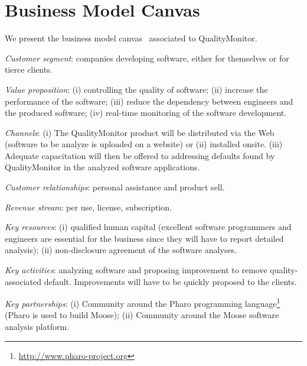 \documentclass[runningheads]{llncs}
\begin{document}

\section{Business Model Canvas}

\newcommand{\vspc}{\vspace{0.1cm}}
We present the business model canvas~\cite{Oste10a} associated to QualityMonitor. \vspc

\noindent\emph{Customer segment}: companies developing software, either for themselves or for tierce clients.\vspc

\noindent\emph{Value proposition}: (i) controlling the quality of software; (ii) increase the performance of the software; (iii) reduce the dependency between engineers and the produced software; (iv) real-time monitoring of the software development. \vspc

\noindent\emph{Channels}: (i) The QualityMonitor product will be distributed via the Web (software to be analyze is uploaded on a website) or (ii) installed onsite. (iii) Adequate capacitation will then be offered to addressing defaults found by QualityMonitor in the analyzed software applications. \vspc

\noindent\emph{Customer relationships}: personal assistance and product sell.\vspace{0.05cm}

\noindent\emph{Revenue stream}: per use, license, subscription. \vspc

\noindent\emph{Key resources}: (i) qualified human capital (excellent software programmers and engineers are essential for the business since they will have to report detailed analysis); (ii) non-disclosure agreement of the software analyses. \vspc

\noindent\emph{Key activities}: analyzing software and proposing improvement to remove quality-associated default. Improvements will have to be quickly proposed to the clients. \vspc

\noindent\emph{Key partnerships}: (i) Community around the Pharo programming language\footnote{\url{http://www.pharo-project.org}} (Pharo is used to build Moose); (ii) Community around the Moose software analysis platform. \vspc
\end{document}
